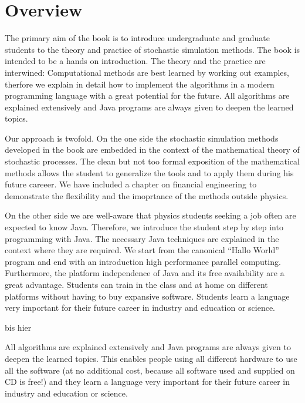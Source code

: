 \documentclass[a4paper]{book}
\begin{document}
\chapter*{Overview}

The primary aim of the book is to introduce undergraduate and graduate 
students to the theory and practice of stochastic simulation methods.
The book is intended to be a  hands on introduction. 
The theory and the practice are interwined:  Computational methods are 
best learned by working out examples, therfore we explain in detail how to 
implement the algorithms in a modern programming language with a great 
potential for the future. All algorithms are explained extensively and 
Java programs are always given to deepen the learned topics.

Our approach is twofold. On the one side the  stochastic simulation
methods developed in the book are embedded in the context of the
mathematical theory of stochastic processes. The clean but not too formal 
exposition of the mathematical methods allows
the student to generalize the tools and to apply them during his future 
careeer. We have included a chapter on financial engineering to
demonstrate the flexibility and the imoprtance of the methods outside physics. 

On the other side we are well-aware that physics students seeking a
job often are expected to know Java.  Therefore, we introduce the
student step by step into programming with Java. The necessary Java
techniques are explained in the context where they are required.
We start from the canonical ``Hallo World'' program and end with an 
introduction high performance parallel computing.
Furthermore, the platform independence of Java and its free
availability are  a great advantage. Students can train in the class 
and at home on different platforms without having to buy expansive
software. Students learn a language very important for 
their future career in industry and education or science.

bis hier

All algorithms are explained extensively and Java programs are always given to deepen the learned topics.
This enables people using all different hardware to use all the software (at no additional cost, because all software used and supplied on CD is free!) and they learn a language very important for their future career in industry and education or science.
\end{document}

